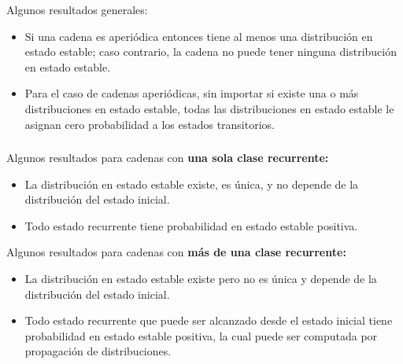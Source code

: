 \documentclass[ 10pt, xcolor = dvipsnames]{beamer}
\begin{document}
\begin{frame}[allowframebreaks]
Algunos resultados generales:
\begin{itemize}
\item Si una cadena es aperi\'odica entonces tiene al menos una distribuci\'on en estado estable; caso contrario, la cadena no puede tener ninguna \linebreak distribuci\'on en estado estable. 
\item Para el caso de cadenas aperi\'odicas, sin importar si existe una o m\'as distribuciones en estado estable, todas las distribuciones en estado estable \linebreak le asignan cero probabilidad a los estados transitorios. 
\end{itemize}

\end{frame}

\begin{frame}[allowframebreaks]
\frametitle{\insertsubsection}

Algunos resultados para cadenas con \textbf{una sola clase recurrente:}
\begin{itemize}
\item La distribuci\'on en estado estable existe, es \'unica, y no depende de la distribuci\'on del estado inicial. 
\item Todo estado recurrente tiene probabilidad en estado estable positiva. 
\end{itemize}
\fullskip

Algunos resultados para cadenas con \textbf{m\'as de una clase recurrente:}
\begin{itemize}
\item La distribuci\'on en estado estable existe pero no es \'unica y depende de la distribuci\'on del estado inicial. 
\item Todo estado recurrente que puede ser alcanzado desde el estado inicial \linebreak tiene probabilidad en estado estable positiva, la cual puede ser computada por propagaci\'on de distribuciones. 
\end{itemize}


\end{frame}
\end{document}
